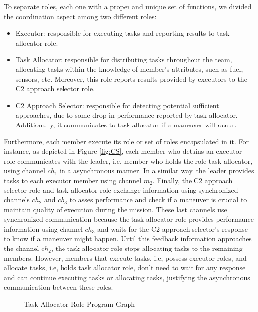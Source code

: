 To separate roles, each one with a proper and unique set of functions, we divided the coordination aspect among two different roles:

\begin{itemize}
    \item Executor: responsible for executing tasks and reporting results to task allocator role.
    \item Task Allocator: responsible for distributing tasks throughout the team, allocating tasks within the knowledge of member's attributes, such as fuel, sensors, etc. Moreover, this role reports results provided by executors to the C2 approach selector role.
    \item C2 Approach Selector: responsible for detecting potential sufficient approaches, due to some drop in performance reported by task allocator. Additionally, it communicates to task allocator if a maneuver will occur.  
\end{itemize}

Furthermore, each member execute its role or set of roles encapsulated in it. For instance, as depicted in Figure \ref{fig:CS}, each member who detains an executor role communicates with the leader, i.e, member who holds the role task allocator, using channel \textit{$ch_1$} in a asynchronous manner. In a similar way, the leader provides tasks to each executor member using channel \textit{$m_2$}. Finally, the C2 approach selector role and task allocator role exchange information using synchronized channels \textit{$ch_2$} and \textit{$ch_3$} to asses performance and check if a maneuver is crucial to maintain quality of execution during the mission. These last channels use synchronized communication because the task allocator role provides performance information using channel \textit{$ch_3$} and waits for the C2 approach selector's response to know if a maneuver might happen. Until this feedback information approaches the channel \textit{$ch_2$}, the task allocator role stops allocating tasks to the remaining members. However, members that execute tasks, i.e, possess executor roles, and allocate tasks, i.e, holds task allocator role, don't need to wait for any response and can continue executing tasks or allocating tasks, justifying the asynchronous communication between these roles.

\begin{figure}[!ht]
    \centering
    \scalebox{.65}{}
    \caption{Task Allocator Role Program Graph}
    \label{fig:TA}
\end{figure}

